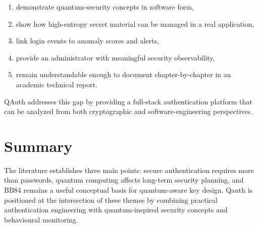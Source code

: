 \documentclass[12pt,a4paper]{report}
\begin{document}
\begin{enumerate}
    \item demonstrate quantum-security concepts in software form,
    \item show how high-entropy secret material can be managed in a real application,
    \item link login events to anomaly scores and alerts,
    \item provide an administrator with meaningful security observability,
    \item remain understandable enough to document chapter-by-chapter in an academic technical report.
\end{enumerate}

QAuth addresses this gap by providing a full-stack authentication platform that can be analyzed from both cryptographic and software-engineering perspectives.

\section{Summary}
The literature establishes three main points: secure authentication requires more than passwords, quantum computing affects long-term security planning, and BB84 remains a useful conceptual basis for quantum-aware key design. Qauth is positioned at the intersection of these themes by combining practical authentication engineering with quantum-inspired security concepts and behavioural monitoring.
\end{document}
